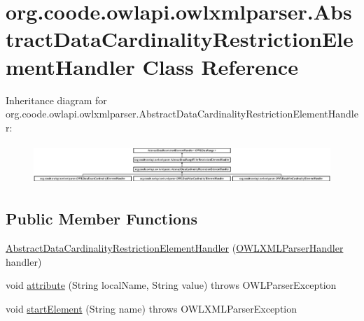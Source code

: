 \hypertarget{classorg_1_1coode_1_1owlapi_1_1owlxmlparser_1_1_abstract_data_cardinality_restriction_element_handler}{\section{org.\-coode.\-owlapi.\-owlxmlparser.\-Abstract\-Data\-Cardinality\-Restriction\-Element\-Handler Class Reference}
\label{classorg_1_1coode_1_1owlapi_1_1owlxmlparser_1_1_abstract_data_cardinality_restriction_element_handler}
}
Inheritance diagram for org.\-coode.\-owlapi.\-owlxmlparser.\-Abstract\-Data\-Cardinality\-Restriction\-Element\-Handler\-:\begin{figure}[H]
\begin{center}
\leavevmode
\includegraphics[height=1.536351cm]{classorg_1_1coode_1_1owlapi_1_1owlxmlparser_1_1_abstract_data_cardinality_restriction_element_handler}
\end{center}
\end{figure}
\subsection*{Public Member Functions}
\begin{DoxyCompactItemize}
\item 
\hyperlink{classorg_1_1coode_1_1owlapi_1_1owlxmlparser_1_1_abstract_data_cardinality_restriction_element_handler_a24c7d53f0431746f6e2c4c38d0710b19}{Abstract\-Data\-Cardinality\-Restriction\-Element\-Handler} (\hyperlink{classorg_1_1coode_1_1owlapi_1_1owlxmlparser_1_1_o_w_l_x_m_l_parser_handler}{O\-W\-L\-X\-M\-L\-Parser\-Handler} handler)
\item 
void \hyperlink{classorg_1_1coode_1_1owlapi_1_1owlxmlparser_1_1_abstract_data_cardinality_restriction_element_handler_a593cba6d21ea664ec75480c59b5bdbbc}{attribute} (String local\-Name, String value)  throws O\-W\-L\-Parser\-Exception 
\item 
void \hyperlink{classorg_1_1coode_1_1owlapi_1_1owlxmlparser_1_1_abstract_data_cardinality_restriction_element_handler_aae2ae8b9fb53a16e192f69dd4d497582}{start\-Element} (String name)  throws O\-W\-L\-X\-M\-L\-Parser\-Exception 
\end{DoxyCompactItemize}
